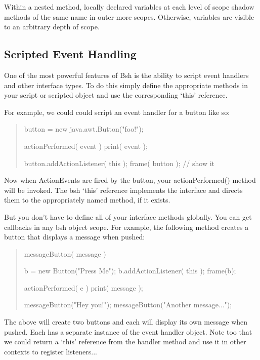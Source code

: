 \documentclass[twoside,11pt,nolof]{starlink}
\begin{document}
Within a nested method, locally declared variables at each level of
scope shadow methods of the same name in outer-more scopes.
Otherwise, variables are visible to an arbitrary depth of scope.

\subsection{Scripted Event Handling}

One of the most powerful features of Bsh is the ability to script
event handlers and other interface types.  To do this simply define
the appropriate methods in your script or scripted object and use the
corresponding `this' reference.

For example, we could could script an event handler for a button like so:
\begin{quote}
\begin{terminalv}
    button = new java.awt.Button("foo!");

    actionPerformed( event ) {
        print( event );
    }

    button.addActionListener( this );
    frame( button );  // show it
\end{terminalv}
\end{quote}
Now when ActionEvents are fired by the button, your actionPerformed()
method will be invoked.  The bsh `this' reference implements
the interface and directs them to the appropriately named method, if it exists.

But you don't have to define all of your interface methods globally.
You can get callbacks in any bsh object scope.  For example, the following
method creates a button that displays a message when pushed:
\begin{quote}
\begin{terminalv}
    messageButton( message ) {
        b = new Button("Press Me");
        b.addActionListener( this );
        frame(b);

        actionPerformed( e ) {
            print( message );
        }
    }

    messageButton("Hey you!");
    messageButton("Another message...");
\end{terminalv}
\end{quote}
The above will create two buttons and each will display its own message
when pushed.  Each has a separate instance of the event handler object.
Note too that we could return a `this' reference from the handler method and
use it in other contexts to register listeners...
\end{document}
